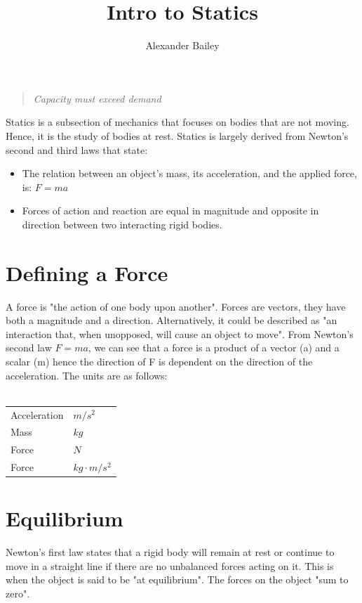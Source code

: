 \documentclass[a4paper, 12pt]{article}
\begin{document}
\title{Intro to Statics}
\author{Alexander Bailey}
\maketitle

\begin{quote}
\textit{Capacity must exceed demand}
\end{quote}

Statics is a subsection of mechanics that focuses on bodies that are not moving.
Hence, it is the study of bodies at rest.
Statics is largely derived from Newton's second and third laws that state:

\begin{itemize}
    \item The relation between an object's mass, its acceleration, and the applied force, is: $F=ma$
    \item Forces of action and reaction are equal in magnitude and opposite in direction between two interacting rigid bodies.
\end{itemize}

\section{Defining a Force}
A force is "the action of one body upon another". Forces are vectors, they have both a magnitude and a direction.
Alternatively, it could be described as "an interaction that, when unopposed, will cause an object to move". 
From Newton's second law $F=ma$, we can see that a force is a product of a vector (a) and a scalar (m) hence
the direction of F is dependent on the direction of the acceleration. The units are as follows:  
\\~\\
\begin{tabular}{l|l}
    Acceleration & $m/s^2$ \\
    Mass & $kg$ \\
    Force & $N$ \\
    Force & $kg\cdot m/s^2$ \\
\end{tabular}

\newpage
\section{Equilibrium}
Newton's first law states that a rigid body will remain at rest or continue to move in a straight line if there are no unbalanced forces
acting on it. This is when the object is said to be "at equilibrium". The forces on the object "sum to zero".
\end{document}

